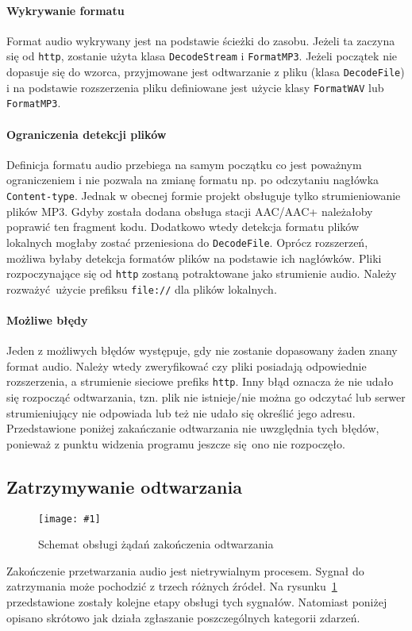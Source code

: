 \documentclass[polish]{aghengthesis}
\newcommand{\imgint}[4]{
	\begin{figure}[{#4}]
		\centering
		\texttt{[image: \#1]}
		\caption{#2}
		\label{#1}
	\end{figure}
}
\newcommand{\imgcs}[3]{\imgint{#1}{#2}{#3}{}}
\begin{document}
			\paragraph{Wykrywanie formatu}
				Format audio wykrywany jest na podstawie ścieżki do zasobu. Jeżeli ta zaczyna się od \lstinline|http|, zostanie użyta klasa \lstinline|DecodeStream| i \lstinline|FormatMP3|. Jeżeli początek nie dopasuje się do wzorca, przyjmowane jest odtwarzanie z pliku (klasa \lstinline|DecodeFile|) i na podstawie rozszerzenia pliku definiowane jest użycie klasy \lstinline|FormatWAV| lub \lstinline|FormatMP3|.
				
			\paragraph{Ograniczenia detekcji plików}
				Definicja formatu audio przebiega na samym początku co jest poważnym ograniczeniem i nie pozwala na zmianę formatu np. po odczytaniu nagłówka \lstinline|Content-type|. Jednak w obecnej formie projekt obsługuje tylko strumieniowanie plików MP3. Gdyby została dodana obsługa stacji AAC/AAC+ należałoby poprawić ten fragment kodu. Dodatkowo wtedy detekcja formatu plików lokalnych mogłaby zostać przeniesiona do \lstinline|DecodeFile|. Oprócz rozszerzeń, możliwa byłaby detekcja formatów plików na podstawie ich nagłówków. Pliki rozpoczynające się od \lstinline|http| zostaną potraktowane jako strumienie audio. Należy rozważyć użycie prefiksu \lstinline|file://| dla plików lokalnych.
			
			\paragraph{Możliwe błędy}
				Jeden z możliwych błędów występuje, gdy nie zostanie dopasowany żaden znany format audio. Należy wtedy zweryfikować czy pliki posiadają odpowiednie rozszerzenia, a strumienie sieciowe prefiks \lstinline|http|. Inny błąd oznacza że nie udało się rozpocząć odtwarzania, tzn. plik nie istnieje/nie można go odczytać lub serwer strumieniujący nie odpowiada lub też nie udało się określić jego adresu. Przedstawione poniżej zakańczanie odtwarzania nie uwzględnia tych błędów, ponieważ z punktu widzenia programu jeszcze się ono nie rozpoczęło.
		
		\subsection{Zatrzymywanie odtwarzania}
			\imgcs{3/PicoRadio-stop}{Schemat obsługi żądań zakończenia odtwarzania}{1}
			Zakończenie przetwarzania audio jest nietrywialnym procesem. Sygnał do zatrzymania może pochodzić z trzech różnych źródeł. Na rysunku~\ref{3/PicoRadio-stop} przedstawione zostały kolejne etapy obsługi tych sygnałów. Natomiast poniżej opisano skrótowo jak działa zgłaszanie poszczególnych kategorii zdarzeń. 
			$ $\\
			
\end{document}
